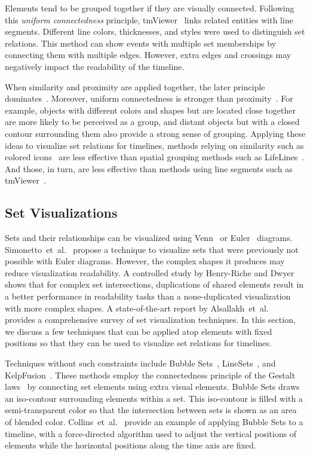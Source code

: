 Elements tend to be grouped together if they are visually connected. Following this \textit{uniform connectedness} principle, tmViewer~\cite{Kumar1998} links related entities with line segments. Different line colors, thicknesses, and styles were used to distinguish set relations. This method can show events with multiple set memberships by connecting them with multiple edges. However, extra edges and crossings may negatively impact the readability of the timeline.

When similarity and proximity are applied together, the later principle dominates~\cite{Ware2013}. Moreover, uniform connectedness is stronger than proximity~\cite{Palmer1994}. For example, objects with different colors and shapes but are located close together are more likely to be perceived as a group, and distant objects but with a closed contour surrounding them also provide a strong sense of grouping. Applying these ideas to visualize set relations for timelines, methods relying on similarity such as colored icons~\cite{Wang2008} are less effective than spatial grouping methods such as LifeLines~\cite{Plaisant1996}. And those, in turn, are less effective than methods using line segments such as tmViewer~\cite{Kumar1998}. 

\subsection{Set Visualizations}
Sets and their relationships can be visualized using Venn~\cite{Ruskey1997} or Euler~\cite{Rodgers2014} diagrams. Simonetto~et~al.~\cite{Simonetto2009} propose a technique to visualize sets that were previously not possible with Euler diagrams. However, the complex shapes it produces may reduce visualization readability. A controlled study by Henry-Riche and Dwyer~\cite{Riche2010} shows that for complex set intersections, duplications of shared elements result in a better performance in readability tasks than a none-duplicated visualization with more complex shapes. A state-of-the-art report by Alsallakh~et~al.~\cite{Alsallakh2014} provides a comprehensive survey of set visualization techniques. In this section, we discuss a few techniques that can be applied atop elements with fixed positions so that they can be used to visualize set relations for timelines. 

Techniques without such constraints include Bubble Sets~\cite{Collins2009a}, LineSets~\cite{Alper2011}, and KelpFusion~\cite{Meulemans2013}. These methods employ the connectedness principle of the Gestalt laws~\cite{Palmer1994} by connecting set elements using extra visual elements. Bubble Sets draws an iso-contour surrounding elements within a set. This iso-contour is filled with a semi-transparent color so that the intersection between sets is shown as an area of blended color. Collins~et~al.~\cite{Collins2009a} provide an example of applying Bubble Sets to a timeline, with a force-directed algorithm used to adjust the vertical positions of elements while the horizontal positions along the time axis are fixed. 

